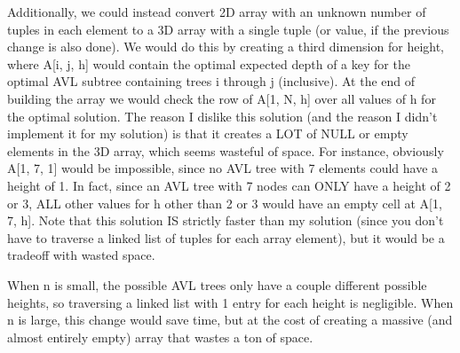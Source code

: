 \documentclass[a4paper]{article}
\begin{document}
Additionally, we could instead convert 2D array with an unknown number of tuples in each element to a 3D array with a single tuple (or value, if the previous change is also done). We would do this by creating a third dimension for height, where A[i, j, h] would contain the optimal expected depth of a key for the optimal AVL subtree containing trees i through j (inclusive). At the end of building the array we would check the row of A[1, N, h] over all values of h for the optimal solution. The reason I dislike this solution (and the reason I didn't implement it for my solution) is that it creates a LOT of NULL or empty elements in the 3D array, which seems wasteful of space. For instance, obviously A[1, 7, 1] would be impossible, since no AVL tree with 7 elements could have a height of 1. In fact, since an AVL tree with 7 nodes can ONLY have a height of 2 or 3, ALL other values for h other than 2 or 3 would have an empty cell at A[1, 7, h].
Note that this solution IS strictly faster than my solution (since you don't have to traverse a linked list of tuples for each array element), but it would be a tradeoff with wasted space.

When n is small, the possible AVL trees only have a couple different possible heights, so traversing a linked list with 1 entry for each height is negligible. When n is large, this change would save time, but at the cost of creating a massive (and almost entirely empty) array that wastes a ton of space.
\end{document}
